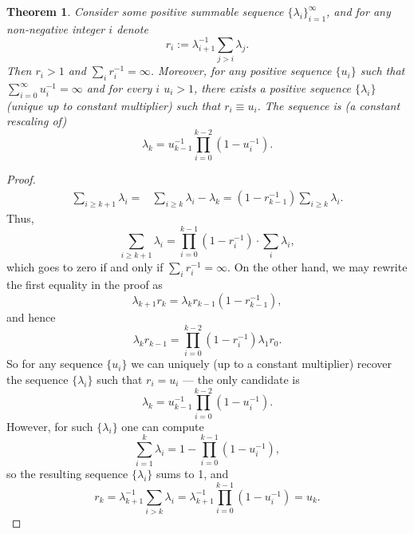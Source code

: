 \documentclass[11pt,notitlepage]{article}
\newtheorem{theorem}{Theorem}
\begin{document}
	\begin{theorem}
		Consider some positive summable sequence $\{\lambda_i\}_{i=1}^\infty$, and for any non-negative integer $i$ denote 
		\[
		r_i := \lambda_{i+1}^{-1}\sum_{j > i}\lambda_j.
		\]
		Then $r_i > 1$ and
		$ \sum_{i} r_i^{-1} = \infty$.
		Moreover, for any positive sequence $\{u_i\}$ such
                that  $\sum_{i = 0}^\infty u_i^{-1} = \infty$ and for
                every $i$ $u_i > 1$, there exists a positive sequence $\{\lambda_i\}$ (unique up to
                constant multiplier) such that  $r_i \equiv u_i$.  The sequence is (a constant rescaling of)
			 \[
			 \lambda_k = u_{k-1}^{-1}\prod_{i=0}^{k-2}(1 - u_i^{-1}).
			 \]
	\end{theorem}
	\begin{proof}
			\begin{align*}
			\sum_{i \geq k+1} \lambda_i =&  \sum_{i \geq k} \lambda_i - \lambda_k
			= (1 - r_{k-1}^{-1})\sum_{i \geq k} \lambda_i.
			\end{align*}
			Thus, 
			\[
			\sum_{i \geq k+1} \lambda_i = \prod_{i =
            0}^{k-1} \left(1 - r_{i}^{-1} \right) \cdot \sum_{i} \lambda_i,
			\]
			which goes to zero if and only if $\sum_{i} r_i^{-1} = \infty$.
			 On the other hand, we may rewrite the first equality in the proof as
			\[
				 \lambda_{k+1}r_k = \lambda_kr_{k-1}(1 - r_{k-1}^{-1}),
			\]
            and hence
			\[
				\lambda_kr_{k-1} =
                \prod_{i=0}^{k-2}\left(1-r_i^{-1}\right)
                \lambda_1r_0.
			\]
			So for any sequence $\{u_i\}$ we can uniquely (up to a
            constant multiplier) recover the sequence $\{\lambda_i\}$ such that  $r_i = u_i$ --- the only candidate is 
			 \[
			 \lambda_k = u_{k-1}^{-1}\prod_{i=0}^{k-2}(1 - u_i^{-1}).
			 \]
			 However, for such $\{\lambda_i\}$ one can compute
			 \[
			 \sum_{i=1}^k \lambda_i = 1 - \prod_{i=0}^{k-1}(1 - u_i^{-1}),
			 \]
			 so the resulting sequence $\{\lambda_i\}$  sums to 1, and 
			 \[
			 r_k = \lambda_{k+1}^{-1}\sum_{i > k} \lambda_i = \lambda_{k+1}^{-1}\prod_{i=0}^{k-1}(1 - u_i^{-1}) = u_k.
			 \]
 			 
 	\end{proof}
\end{document}
